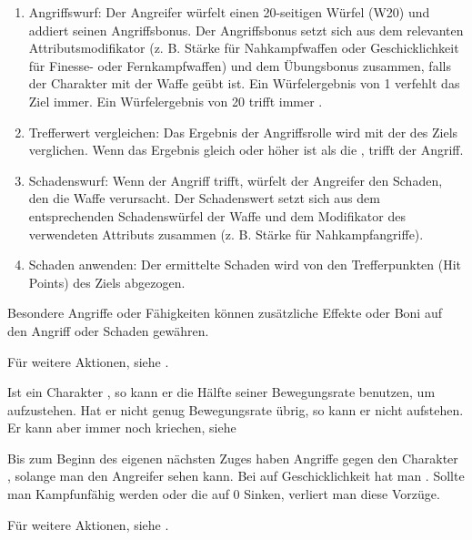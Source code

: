 \begin{enumerate}

\item Angriffswurf: Der Angreifer würfelt einen 20-seitigen Würfel (W20) und addiert seinen Angriffsbonus. Der Angriffsbonus setzt sich aus dem relevanten Attributsmodifikator (z. B. Stärke für Nahkampfwaffen oder Geschicklichkeit für Finesse- oder Fernkampfwaffen) und dem Übungsbonus zusammen, falls der Charakter mit der Waffe geübt ist. Ein Würfelergebnis von 1 verfehlt das Ziel immer. Ein Würfelergebnis von 20 trifft immer .
\item Trefferwert vergleichen: Das Ergebnis der Angriffsrolle wird mit der  des Ziels verglichen. Wenn das Ergebnis gleich oder höher ist als die , trifft der Angriff.
\item Schadenswurf: Wenn der Angriff trifft, würfelt der Angreifer den Schaden, den die Waffe verursacht. Der Schadenswert setzt sich aus dem entsprechenden Schadenswürfel der Waffe und dem Modifikator des verwendeten Attributs zusammen (z. B. Stärke für Nahkampfangriffe).
\item Schaden anwenden: Der ermittelte Schaden wird von den Trefferpunkten (Hit Points) des Ziels abgezogen.
\end{enumerate}
Besondere Angriffe oder Fähigkeiten können zusätzliche Effekte oder Boni auf den Angriff oder Schaden gewähren.

Für weitere Aktionen, siehe .



Ist ein Charakter , so kann er die Hälfte seiner Bewegungsrate benutzen, um aufzustehen. Hat er nicht genug Bewegungsrate übrig, so kann er nicht aufstehen. Er kann aber immer noch kriechen, siehe 



Bis zum Beginn des eigenen nächsten Zuges haben Angriffe gegen den Charakter , solange man den Angreifer sehen kann. Bei  auf Geschicklichkeit hat man . Sollte man Kampfunfähig werden oder die  auf 0 Sinken, verliert man diese Vorzüge.

Für weitere Aktionen, siehe .



